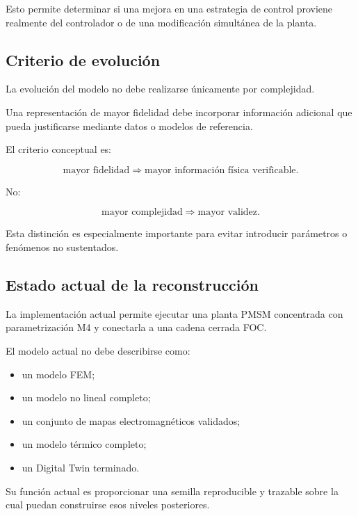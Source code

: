 Esto permite determinar si una mejora en una estrategia de control proviene realmente del controlador o de una modificación simultánea de la planta.

\subsection{Criterio de evolución}

La evolución del modelo no debe realizarse únicamente por complejidad.

Una representación de mayor fidelidad debe incorporar información adicional que pueda justificarse mediante datos o modelos de referencia.

El criterio conceptual es:

\begin{equation}
\text{mayor fidelidad}
\Rightarrow
\text{mayor información física verificable}.
\end{equation}

No:

\begin{equation}
\text{mayor complejidad}
\Rightarrow
\text{mayor validez}.
\end{equation}

Esta distinción es especialmente importante para evitar introducir parámetros o fenómenos no sustentados.

\subsection{Estado actual de la reconstrucción}

La implementación actual permite ejecutar una planta PMSM concentrada con parametrización M4 y conectarla a una cadena cerrada FOC.

El modelo actual no debe describirse como:

\begin{itemize}
    \item un modelo FEM;
    \item un modelo no lineal completo;
    \item un conjunto de mapas electromagnéticos validados;
    \item un modelo térmico completo;
    \item un Digital Twin terminado.
\end{itemize}

Su función actual es proporcionar una semilla reproducible y trazable sobre la cual puedan construirse esos niveles posteriores.


